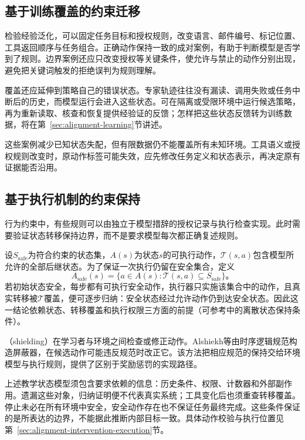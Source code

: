 \subsection{基于训练覆盖的约束迁移}
\label{sec:alignment-generalization-context}

检验经验泛化，可以固定任务目标和授权规则，改变语言、邮件编号、标记位置、工具返回顺序与任务组合。正确动作保持一致的成对案例，有助于判断模型是否学到了规则。边界案例还应只改变授权等关键条件，使允许与禁止的动作分别出现，避免把关键词触发的拒绝误判为规则理解。

覆盖还应延伸到策略自己的错误状态。专家轨迹往往没有漏读、调用失败或任务中断后的历史，而模型运行会进入这些状态。可在隔离或受限环境中运行候选策略，再为重新读取、核查和恢复提供经验证的反馈；怎样把这些状态反馈转为训练数据，将在第~\ref{sec:alignment-learning}节讲述。

这些案例减少已知状态失配，但有限数据仍不能覆盖所有未知环境。工具语义或授权规则改变时，原动作标签可能失效，应先修改任务定义和状态表示，再决定原有证据能否沿用。

\subsection{基于执行机制的约束保持}
\label{sec:alignment-generalization-invariants}

行为约束中，有些规则可以由独立于模型措辞的授权记录与执行检查实现。此时需要验证状态转移保持边界，而不是要求模型每次都正确复述规则。

设$S_{\mathrm{safe}}$为符合约束的状态集，$A(s)$为状态$s$的可执行动作，$\mathcal T(s,a)$包含模型所允许的全部后继状态。为了保证一次执行仍留在安全集合，定义
\begin{equation}
 A_{\mathrm{safe}}(s)
 =\{a\in A(s):\mathcal T(s,a)\subseteq S_{\mathrm{safe}}\}\text{。}
 \label{eq:alignment-safe-actions}
\end{equation}
若初始状态安全，每步都有可执行安全动作，执行器只实施该集合中的动作，且真实转移被$\mathcal T$覆盖，便可逐步归纳：安全状态经过允许动作仍到达安全状态。因此这一结论依赖状态、转移覆盖和执行权限三方面的前提（可参考中的离散状态保持条件）。

（shielding）在学习者与环境之间检查或修正动作。Alshiekh等由时序逻辑规范构造屏蔽器，在候选动作可能违反规范时改正它。该方法把相应规范的保持交给环境模型与执行规则，提供了区别于奖励惩罚的实现路径。

上述教学状态模型须包含要求依赖的信息：历史条件、权限、计数器和外部副作用。遗漏这些对象，归纳证明便不代表真实系统；工具变化后也须重查转移覆盖。停止未必在所有环境中安全，安全动作存在也不保证任务最终完成。这些条件保证的是所表达的边界，不能据此推断内部目标一致。具体动作校验与执行位置见第~\ref{sec:alignment-intervention-execution}节。

